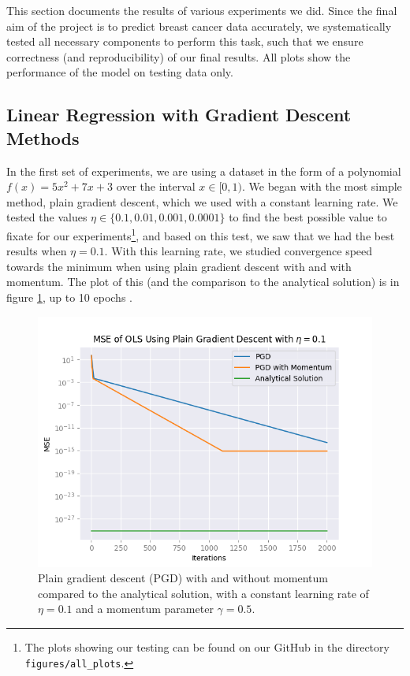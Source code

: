This section documents the results of various experiments we did. Since the final aim of the
project is to predict breast cancer data accurately, we systematically tested all necessary components to perform this task, such that we ensure correctness (and reproducibility) of our final results. All plots show the performance of the model on testing data only.

\subsection{Linear Regression with Gradient Descent Methods}
In the first set of experiments, we are using a dataset in the form of a polynomial $f(x) = 5x^2 + 7x +3$ over the interval $x \in [0,1)$. We began with the most simple method, plain gradient descent, which we used with a constant learning rate. We tested the values $\eta \in \{ 0.1, 0.01, 0.001, 0.0001\}$ to find the best possible value to fixate for our experiments\footnote{The plots showing our testing can be found on our GitHub in the directory \texttt{figures/all\_plots}.}, and based on this test, we saw that we had the best results when $\eta = 0.1$. With this learning rate, we studied convergence speed towards the minimum when using plain gradient descent with and with momentum. The plot of this (and the comparison to the analytical solution) is in figure \ref{fig:plainVSanalytical}, up to 10 epochs \cite{mediumEpochNumber}\cite{epochsBreastCancerArticle}.
\begin{figure}
    \centering
    \includegraphics[width=\linewidth]{figures/all_plots/plain_mse_pr_iter_eta_1e-1.png}
    \caption{Plain gradient descent (PGD) with and without momentum compared to the analytical solution, with a constant learning rate of $\eta = 0.1$ and a momentum parameter $\gamma = 0.5$.}
    \label{fig:plainVSanalytical}
\end{figure}

